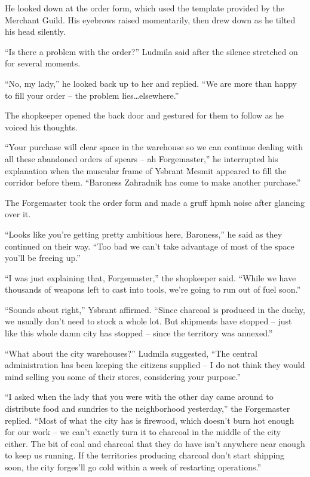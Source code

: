 He looked down at the order form, which used the template provided by the Merchant Guild. His eyebrows raised momentarily, then drew down as he tilted his head silently.

 

“Is there a problem with the order?” Ludmila said after the silence stretched on for several moments.

 

“No, my lady,” he looked back up to her and replied. “We are more than happy to fill your order – the problem lies…elsewhere.”

 

The shopkeeper opened the back door and gestured for them to follow as he voiced his thoughts.

 

“Your purchase will clear space in the warehouse so we can continue dealing with all these abandoned orders of spears – ah Forgemaster,” he interrupted his explanation when the muscular frame of Ysbrant Mesmit appeared to fill the corridor before them. “Baroness Zahradnik has come to make another purchase.”

 

The Forgemaster took the order form and made a gruff hpmh noise after glancing over it.

 

“Looks like you’re getting pretty ambitious here, Baroness,” he said as they continued on their way. “Too bad we can’t take advantage of most of the space you’ll be freeing up.”

 

“I was just explaining that, Forgemaster,” the shopkeeper said. “While we have thousands of weapons left to cast into tools, we’re going to run out of fuel soon.”

 

“Sounds about right,” Ysbrant affirmed. “Since charcoal is produced in the duchy, we usually don’t need to stock a whole lot. But shipments have stopped – just like this whole damn city has stopped – since the territory was annexed.”

 

“What about the city warehouses?” Ludmila suggested, “The central administration has been keeping the citizens supplied – I do not think they would mind selling you some of their stores, considering your purpose.”

 

“I asked when the lady that you were with the other day came around to distribute food and sundries to the neighborhood yesterday,” the Forgemaster replied. “Most of what the city has is firewood, which doesn’t burn hot enough for our work – we can’t exactly turn it to charcoal in the middle of the city either. The bit of coal and charcoal that they do have isn’t anywhere near enough to keep us running. If the territories producing charcoal don’t start shipping soon, the city forges’ll go cold within a week of restarting operations.”

